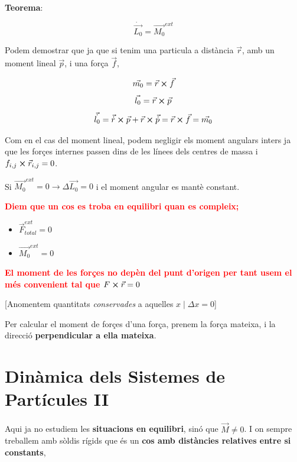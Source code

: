 \documentclass[12pt]{article}
\begin{document}
\textbf{Teorema}: 

\[\dot{\vec{L_0}} =\vec{M_0}^{ext}\]

Podem demostrar que ja que si tenim una particula a distància $\vec{r}$, amb un moment lineal $\vec{p}$, i una força $\vec{f}$,

\[\vec{m_0} = \vec{r} \cross \vec{f}\]
\[\vec{l_0} = \vec{r} \cross \vec{p}\]
\[\vec{\dot{l_0}} = \vec{\dot{r}} \cross \vec{p} + \vec{r} \cross \vec{\dot{p}} = \vec{r} \cross \vec{f} = \vec{m_0}\]

Com en el cas del moment lineal, podem negligir els moment angulars inters ja que les forçes internes passen dins de les línees dels centres de massa i $f_{i,j} \cross \vec{r}_{i,j} = 0$. 

Si $\vec{M_0}^{ext} = 0 \rightarrow \Delta \vec{L_0} = 0$ i el moment angular es mantè constant.

\textcolor{red}{\textbf{Diem que un cos es troba en equilibri quan es compleix;}}

\begin{itemize}
    \item $\vec{F}_{total}^{ext} = 0$
    \item $\vec{M_0}^{ext} = 0$
\end{itemize}

\textcolor{red}{\textbf{El moment de les forçes no depèn del punt d'origen per tant usem el més convenient tal que $F\cross\vec{r} = 0$}}

[Anomentem quantitats \textit{conservades} a aquelles $x \mid \Delta x = 0$]

Per calcular el moment de forçes d'una força, prenem la força mateixa, i la direcció \textbf{perpendicular a ella mateixa}.

\section{Dinàmica dels Sistemes de Partícules II}

Aqui ja no estudiem les \textbf{situacions en equilibri}, sinó que $\vec{M} \neq 0$. I on sempre treballem amb sòldis rígids que és un \textbf{cos amb distàncies relatives entre si constants},

\begin{center}
\end{center}
\end{document}

